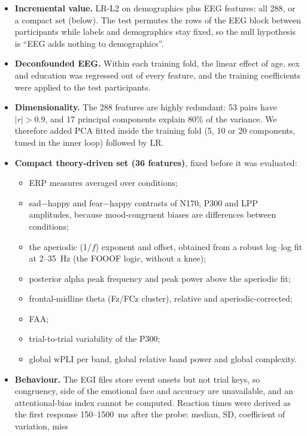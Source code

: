 \begin{itemize}
  \item \textbf{Incremental value.} LR-L2 on demographics plus EEG features: all 288, or a compact set (below). The
        test permutes the rows of the EEG block between participants while labels and demographics stay fixed, so
        the null hypothesis is ``EEG adds nothing to demographics''.
  \item \textbf{Deconfounded EEG.} Within each training fold, the linear effect of age, sex and education was
        regressed out of every feature, and the training coefficients were applied to the test participants.
  \item \textbf{Dimensionality.} The 288 features are highly redundant: 53 pairs have $|r|>0.9$, and 17 principal
        components explain 80\% of the variance. We therefore added PCA fitted inside the training fold
        (5, 10 or 20 components, tuned in the inner loop) followed by LR.
  \item \textbf{Compact theory-driven set (36 features)}, fixed before it was evaluated:
        \begin{itemize}
          \item ERP measures averaged over conditions;
          \item sad$-$happy and fear$-$happy contrasts of N170, P300 and LPP amplitudes, because mood-congruent
                biases are differences between conditions;
          \item the aperiodic (1/$f$) exponent and offset, obtained from a robust log--log fit at 2--35~Hz (the
                FOOOF logic, without a knee);
          \item posterior alpha peak frequency and peak power above the aperiodic fit;
          \item frontal-midline theta (Fz/FCz cluster), relative and aperiodic-corrected;
          \item FAA;
          \item trial-to-trial variability of the P300;
          \item global wPLI per band, global relative band power and global complexity.
        \end{itemize}
  \item \textbf{Behaviour.} The EGI files store event onsets but not trial keys, so congruency, side of the
        emotional face and accuracy are unavailable, and an attentional-bias index cannot be computed. Reaction times
        were derived as the first response 150--1500~ms after the probe: median, SD, coefficient of variation, miss

\end{itemize}
